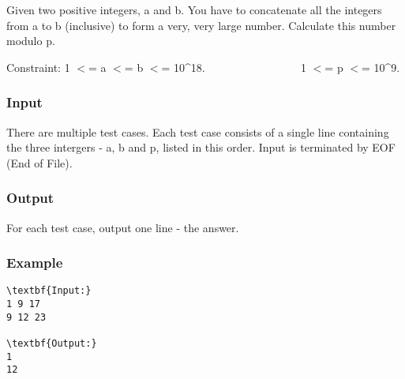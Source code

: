

Given two positive integers, a and b. You have to concatenate all the integers from a to b (inclusive) to form a very, very large number. Calculate this number modulo p.

Constraint: 1 $<$= a $<$= b $<$= 10\textasciicircum18. 
                 1 $<$= p $<$= 10\textasciicircum9.

\subsubsection{Input}

There are multiple test cases. 
 Each test case consists of a single line containing the three intergers - a, b and p, listed in this order.
 Input is terminated by EOF (End of File).

\subsubsection{Output}

For each test case, output one line - the answer.

\subsubsection{Example}
\begin{verbatim}
\textbf{Input:}
1 9 17
9 12 23

\textbf{Output:}
1
12
\end{verbatim}
